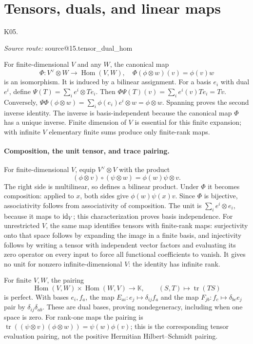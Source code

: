 \documentclass[11pt,a4paper]{book}
\makeatletter
\theoremstyle{definition}\newtheorem{definition}[theorem]{Definition}
\theoremstyle{remark}\newtheorem{remark}[theorem]{Remark}
\newcommand{\K}{\mathbb K}\newcommand{\R}{\mathbb R}\newcommand{\C}{\mathbb C}
\DeclareMathOperator{\Hom}{Hom}\DeclareMathOperator{\End}{End}
\DeclareMathOperator{\tr}{tr}\DeclareMathOperator{\Span}{span}
\newcommand{\Kentry}[2]{\section{#2}\label{k:#1}\noindent\textsf{\small K05.\detokenize{#1}}\par
  \begingroup\small\color{black!65}\textit{Source route: }\csname source@#1\endcsname\par\endgroup}
\makeatother
\begin{document}
\Kentry{15.tensor_dual_hom}{Tensors, duals, and linear maps}
For finite-dimensional $V$ and any $W$, the canonical map
\[
 \Phi:V^\vee\otimes W\longrightarrow\Hom(V,W),\quad
 \Phi(\phi\otimes w)(v)=\phi(v)w
\]
is an isomorphism. It is induced by a bilinear assignment. For a basis $e_i$ with dual $e^i$, define $\Psi(T)=\sum_i e^i\otimes Te_i$. Then $\Phi\Psi(T)(v)=\sum_i e^i(v)Te_i=Tv$. Conversely, $\Psi\Phi(\phi\otimes w)=\sum_i\phi(e_i)e^i\otimes w=\phi\otimes w$. Spanning proves the second inverse identity. The inverse is basis-independent because the canonical map $\Phi$ has a unique inverse. Finite dimension of $V$ is essential for this finite expansion; with infinite $V$ elementary finite sums produce only finite-rank maps.


\paragraph{Composition, the unit tensor, and trace pairing.}
For finite-dimensional $V$, equip $V^\vee\otimes V$ with the product
\[
 (\phi\otimes v)\circ(\psi\otimes w)=\phi(w)\psi\otimes v.
\]
The right side is multilinear, so defines a bilinear product. Under $\Phi$ it becomes composition: applied to $x$, both sides give $\phi(w)\psi(x)v$. Since $\Phi$ is bijective, associativity follows from associativity of composition. The unit is $\sum_i e^i\otimes e_i$, because it maps to $\operatorname{id}_V$; this characterization proves basis independence. For unrestricted $V$, the same map identifies tensors with finite-rank maps: surjectivity onto that space follows by expanding the image in a finite basis, and injectivity follows by writing a tensor with independent vector factors and evaluating its zero operator on every input to force all functional coefficients to vanish. It gives no unit for nonzero infinite-dimensional $V$: the identity has infinite rank.

For finite $V,W$, the pairing
\[
 \Hom(V,W)\times\Hom(W,V)\longrightarrow\K,
 \qquad(S,T)\longmapsto\tr(TS)
\]
 is perfect. With bases $e_i,f_a$, the map $E_{ai}:e_j\mapsto\delta_{ij}f_a$ and the map $F_{jb}:f_c\mapsto\delta_{bc}e_j$ pair by $\delta_{ij}\delta_{ab}$. These are dual bases, proving nondegeneracy, including when one space is zero. For rank-one maps the pairing is $\tr((\psi\otimes v)(\phi\otimes w))=\psi(w)\phi(v)$; this is the corresponding tensor evaluation pairing, not the positive Hermitian Hilbert--Schmidt pairing.
\end{document}
